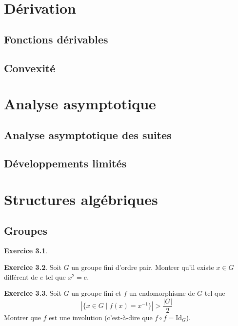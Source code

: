 \documentclass[12pt,a4paper]{book}
\theoremstyle{definition}
\newtheorem{exo}{Exercice}[section]
\theoremstyle{remark}
\newcommand{\Id}{\mathrm{Id}}
\begin{document}

\chapter{Dérivation}

\section{Fonctions dérivables}

\section{Convexité}

\chapter{Analyse asymptotique}

\section{Analyse asymptotique des suites}

\section{Développements limités}

\chapter{Structures algébriques}

\section{Groupes}


\begin{exo}
    
\end{exo}

\begin{exo}
    Soit $G$ un groupe fini d'ordre pair. Montrer qu'il existe $x\in G$ différent de $e$ tel que $x^2 = e$.
\end{exo}

\begin{exo}
    Soit $G$ un groupe fini et $f$ un endomorphisme de $G$ tel que
    \[|\{x \in G \mid f(x) = x^{-1}\}| > \frac{|G|}{2}\]
    Montrer que $f$ est une involution (c'est-à-dire que $f \circ f = \Id_G$).
\end{exo}
\end{document}
